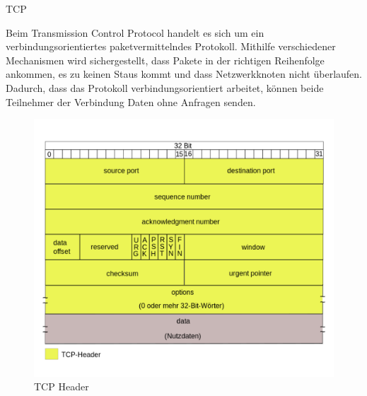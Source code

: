\newpage


TCP

Beim Transmission Control Protocol handelt es sich um ein verbindungsorientiertes paketvermittelndes Protokoll. Mithilfe verschiedener Mechanismen wird sichergestellt, dass Pakete in der richtigen Reihenfolge ankommen, es zu keinen Staus kommt und dass Netzwerkknoten nicht überlaufen. Dadurch, dass das Protokoll verbindungsorientiert arbeitet, können beide Teilnehmer der Verbindung Daten ohne Anfragen senden. 

\begin{figure}
	\includegraphics[width=\textwidth]{images/TCP_header.pdf}
	\caption{TCP Header}
	\label{fig:tcp_header}
\end{figure}

